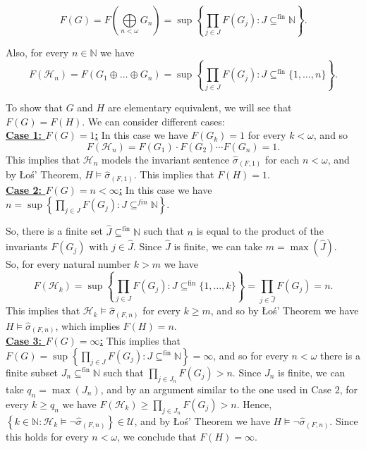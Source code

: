 \documentclass[11pt]{amsart}
\theoremstyle{definition}
\newcommand{\Los}{\L o\'s}
\begin{document}
\[F(G) = F\left( \bigoplus\limits_{n<\omega} G_{n}\right) = \sup\left\{\prod\limits_{j\in J} F(G_{j}) : J\subseteq^{\text{fin}} \mathbb{N}\right\}.\]

Also, for every $n\in\mathbb{N}$ we have
\[F(\mathcal{H}_{n}) = F (G_{1}\oplus \dots \oplus G_{n}) = \sup\left\{\prod\limits_{j\in J} F(G_{j}) : J\subseteq^{\text{fin}} \{1,\dots,n\}\right\}.\]

To show that $G$ and $H$ are elementary equivalent, we will see that $F(G) = F(H)$. We can consider different cases:\\

\underline{\textbf{Case 1: $F(G)=1$:}} In this case we have $F(G_{k})=1$ for every $k<\omega$, and so \[F(\mathcal{H}_n)=F(G_1)\cdot F(G_2)\cdots F(G_n)=1.\] This implies that $\mathcal{H}_{n}$ models the invariant sentence $\hat{\sigma}_{(F,1)}$ for each $n<\omega$, and by \Los' Theorem, $H\models\hat{\sigma}_{(F,1)}$. This implies that $F(H)=1$.\\

\underline{\textbf{Case 2: $F(G)=n<\infty$:}} In this case we have $\displaystyle{n=\sup\left\{\prod\limits_{j\in J} F(G_{j}) : J\subseteq^{fin} \mathbb{N}\right\}.}$

So, there is a finite set $\hat{J}\subseteq^{\text{fin}}\mathbb{N}$ such that $n$ is equal to the product of the invariants $F(G_j)$ with $j\in \widehat{J}$. Since $\hat{J}$ is finite, we can take $m=\max(\hat{J})$.\\

So, for every natural number $k>m$ we have 
\[F(\mathcal{H}_{k}) = \sup\left\{\prod\limits_{j\in J} F(G_{j}) : J\subseteq^{\text{fin}} \{1,\dots,k\}\right\} = \prod\limits_{j\in\hat{J}} F(G_{j}) = n.\]
This implies that $\mathcal{H}_{k}\models\hat{\sigma}_{(F,n)}$ for every $k\geq m$, and so by \Los' Theorem we have $H\models\hat{\sigma}_{(F,n)}$, which implies $F(H)=n$.\\

\underline{\textbf{Case 3: $F(G)=\infty$:}} This implies that $F(G) = \sup\left\{\prod\limits_{j\in J} F(G_{j}) : J\subseteq^{\text{fin}} \mathbb{N}\right\}=\infty$, and so for every $n<\omega$ there is a finite subset $J_n\subseteq^{\text{fin}}\mathbb{N}$ such that $\prod\limits_{j\in J_{n}} F(G_{j})>n$. Since $J_{n}$ is finite, we can take $q_{n}=\max(J_{n})$, and by an argument similar to the one used in Case 2, for every $k\geq q_{n}$ we have $\displaystyle{F(\mathcal{H}_{k}) \geq \prod\limits_{j\in J_{n}} F(G_{j}) >n}$. Hence, $\left\{k\in\mathbb{N}: \mathcal{H}_{k}\models\neg\hat{\sigma}_{(F,n)}\right\} \in \mathcal{U}$, and by \Los' Theorem we have $H\models\neg\hat{\sigma}_{(F,n)}$. Since this holds for every $n<\omega$, we conclude that $F(H)=\infty$.\\
\end{document}
